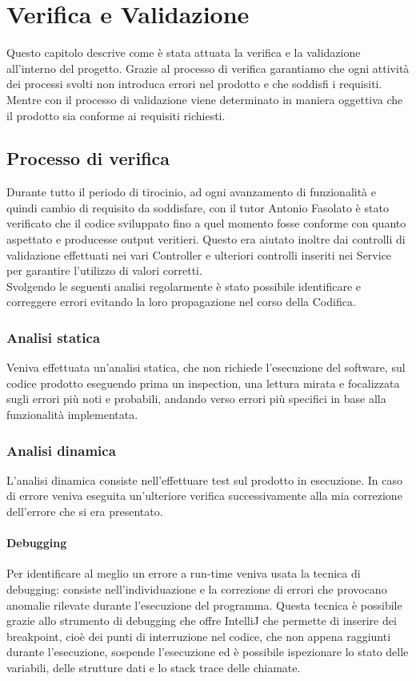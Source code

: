 \chapter{Verifica e Validazione}
\label{cap:verifica-validazione}

Questo capitolo descrive come è stata attuata la verifica e la validazione all'interno del progetto. Grazie al processo di verifica garantiamo che ogni attività dei processi svolti non introduca errori nel prodotto e che soddisfi i requisiti. Mentre con il processo di validazione viene determinato in maniera oggettiva che il prodotto sia conforme ai requisiti richiesti.\\
\section{Processo di verifica}
Durante tutto il periodo di tirocinio, ad ogni avanzamento di funzionalità e quindi cambio di requisito da soddisfare, con il tutor Antonio Fasolato è stato verificato che il codice sviluppato fino a quel momento fosse conforme con quanto aspettato e producesse output veritieri. Questo era aiutato inoltre dai controlli di validazione effettuati nei vari Controller e ulteriori controlli inseriti nei Service per garantire l’utilizzo di valori corretti.\\
Svolgendo le seguenti analisi regolarmente è stato possibile identificare e correggere errori evitando la loro propagazione nel corso della Codifica.
\subsection{Analisi statica}
Veniva effettuata un’analisi statica, che non richiede l'esecuzione del software, sul codice prodotto eseguendo prima un inspection, una lettura mirata e focalizzata sugli errori più noti e probabili, andando verso errori più specifici in base alla funzionalità implementata.
\subsection{Analisi dinamica}
L'analisi dinamica consiste nell'effettuare test sul prodotto in esecuzione. In caso di errore veniva eseguita un’ulteriore verifica successivamente alla mia correzione dell’errore che si era presentato.\\
\subsubsection{Debugging}
Per identificare al meglio un errore a run-time veniva usata la tecnica di debugging: consiste nell'individuazione e la correzione di errori che provocano anomalie rilevate durante l'esecuzione del programma. Questa tecnica è possibile grazie allo strumento di debugging che offre IntelliJ che permette di inserire dei breakpoint, cioè dei punti di interruzione nel codice, che non appena raggiunti durante l'esecuzione, sospende l'esecuzione ed è possibile ispezionare lo stato delle variabili, delle strutture dati e lo stack trace delle chiamate.\\ 
